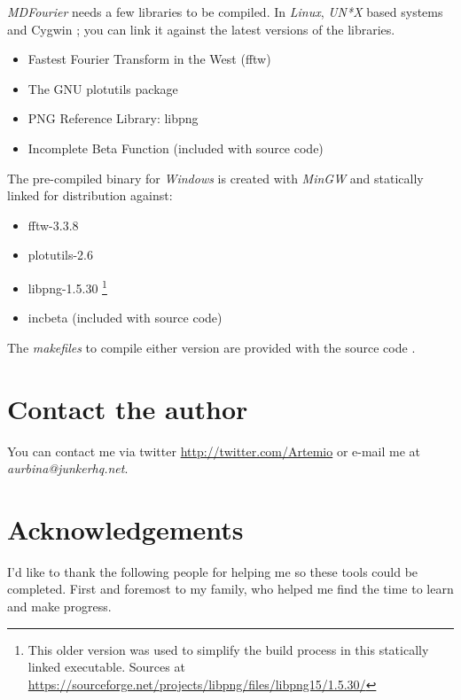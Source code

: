 \documentclass[10pt,a4paper]{report}
\begin{document}
\begin{appendices}
\textit{MDFourier} needs a few libraries to be compiled. In \textit{Linux}, \textit{UN*X} based systems and Cygwin \cite{cygwin}; you can link it against the latest versions of the libraries. 

\begin{itemize}
	\item Fastest Fourier Transform in the West (fftw) \cite{fftw}
	\item The GNU plotutils package \cite{libplot}
	\item PNG Reference Library: libpng \cite{libpng}
	\item Incomplete Beta Function \cite{betafunction} (included with source code)
\end{itemize}

The pre-compiled binary for \textit{Windows} is created with \textit{MinGW}\cite{mingw} and statically linked for distribution against:

\begin{itemize}
	\item fftw-3.3.8 \cite{fftw}
	\item plotutils-2.6 \cite{libplot}
	\item libpng-1.5.30 \footnote{This older version was used to simplify the build process in this statically linked executable. Sources at \url{https://sourceforge.net/projects/libpng/files/libpng15/1.5.30/}}
	\item incbeta \cite{betafunction} (included with source code)
\end{itemize}

The \textit{makefiles} to compile either version are provided with the source code \cite{sourcecode}.

\chapter{Contact the author}
\label{contact}

You can contact me via twitter \url{http://twitter.com/Artemio} or e-mail me at \textit{aurbina@junkerhq.net}.

\chapter{Acknowledgements}

I'd like to thank the following people for helping me so these tools could be completed. First and foremost to my family, who helped me find the time to learn and make progress.

\end{appendices}
\end{document}
